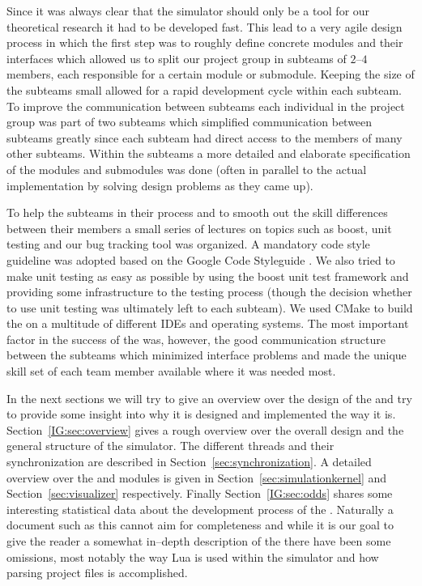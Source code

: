\noindent
Since it was always clear that the simulator should only be a tool for our theoretical research it had to be developed fast. This lead to a very agile design process in which the first step was to roughly define concrete modules and their interfaces which allowed us to split our project group in subteams of $2$--$4$ members, each responsible for a certain module or submodule. Keeping the size of the subteams small allowed for a rapid development cycle within each subteam. To improve the communication between subteams each individual in the project group was part of two subteams which simplified communication between subteams greatly since each subteam had direct access to the members of many other subteams. Within the subteams a more detailed and elaborate specification of the modules and submodules was done (often in parallel to the actual implementation by solving design problems as they came up).\smallskip

\noindent
To help the subteams in their process and to smooth out the skill differences between their members a small series of lectures on topics such as boost, unit testing and our bug tracking tool was organized. A mandatory code style guideline was adopted based on the Google Code Styleguide \cite{reference:Google}. We also tried to make unit testing as easy as possible by using the boost unit test framework and providing some infrastructure to the testing process (though the decision whether to use unit testing was ultimately left to each subteam). We used CMake \cite{reference:CMake} to build the \RSS on a multitude of different IDEs and operating systems. The most important factor in the success of the \RSS was, however, the good communication structure between the subteams which minimized interface problems and made the unique skill set of each team member available where it was needed most.\smallskip

\noindent
In the next sections we will try to give an overview over the design of the \RSS and try to provide some insight into why it is designed and implemented the way it is. Section~\ref{IG:sec:overview} gives a rough overview over the overall design and the general structure of the simulator. The different threads and their synchronization are described in Section~\ref{sec:synchronization}. A detailed overview over the  and  modules is given in Section~\ref{sec:simulationkernel} and Section~\ref{sec:visualizer} respectively. Finally Section~\ref{IG:sec:odds} shares some interesting statistical data about the development process of the \RSS. Naturally a document such as this cannot aim for completeness and while it is our goal to give the reader a somewhat in--depth description of the \RSS there have been some omissions, most notably the way Lua is used within the simulator and how parsing project files is accomplished. 

